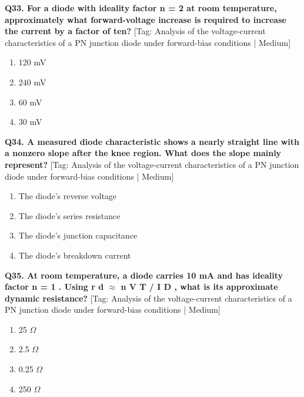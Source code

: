 \noindent\textbf{Q33. For a diode with ideality factor n = 2 at room temperature, approximately what forward-voltage increase is required to increase the current by a factor of ten?} \hfill [Tag: Analysis of the voltage-current characteristics of a PN junction diode under forward-bias conditions | Medium]
\begin{enumerate}[label=(\alph*),topsep=2pt,itemsep=1pt,partopsep=0pt,parsep=0pt]
    \item {120 mV}
    \item {240 mV}
    \item {60 mV}
    \item {30 mV}
\end{enumerate}
\vspace{2mm}

\noindent\textbf{Q34. A measured diode characteristic shows a nearly straight line with a nonzero slope after the knee region. What does the slope mainly represent?} \hfill [Tag: Analysis of the voltage-current characteristics of a PN junction diode under forward-bias conditions | Medium]
\begin{enumerate}[label=(\alph*),topsep=2pt,itemsep=1pt,partopsep=0pt,parsep=0pt]
    \item {The diode's reverse voltage}
    \item {The diode's series resistance}
    \item {The diode's junction capacitance}
    \item {The diode's breakdown current}
\end{enumerate}
\vspace{2mm}

\noindent\textbf{Q35. At room temperature, a diode carries 10 mA and has ideality factor n = 1 . Using r d $\approx$ n V T / I D , what is its approximate dynamic resistance?} \hfill [Tag: Analysis of the voltage-current characteristics of a PN junction diode under forward-bias conditions | Medium]
\begin{enumerate}[label=(\alph*),topsep=2pt,itemsep=1pt,partopsep=0pt,parsep=0pt]
    \item {25 $\Omega$}
    \item {2.5 $\Omega$}
    \item {0.25 $\Omega$}
    \item {250 $\Omega$}
\end{enumerate}
\vspace{2mm}

